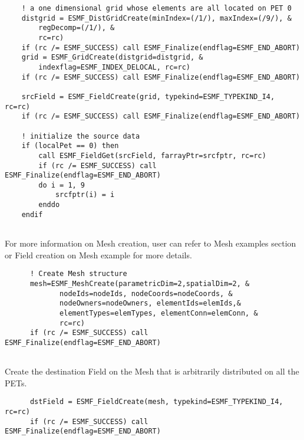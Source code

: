  \begin{verbatim}
    ! a one dimensional grid whose elements are all located on PET 0
    distgrid = ESMF_DistGridCreate(minIndex=(/1/), maxIndex=(/9/), &
        regDecomp=(/1/), &
        rc=rc)
    if (rc /= ESMF_SUCCESS) call ESMF_Finalize(endflag=ESMF_END_ABORT)
    grid = ESMF_GridCreate(distgrid=distgrid, &
        indexflag=ESMF_INDEX_DELOCAL, rc=rc)
    if (rc /= ESMF_SUCCESS) call ESMF_Finalize(endflag=ESMF_END_ABORT)

    srcField = ESMF_FieldCreate(grid, typekind=ESMF_TYPEKIND_I4, rc=rc)
    if (rc /= ESMF_SUCCESS) call ESMF_Finalize(endflag=ESMF_END_ABORT)

    ! initialize the source data
    if (localPet == 0) then
        call ESMF_FieldGet(srcField, farrayPtr=srcfptr, rc=rc)
        if (rc /= ESMF_SUCCESS) call ESMF_Finalize(endflag=ESMF_END_ABORT)
        do i = 1, 9
            srcfptr(i) = i
        enddo
    endif
 
\end{verbatim}
 

   For more information on Mesh creation, user can refer to Mesh examples section or Field creation
   on Mesh example for more details. 

 \begin{verbatim}
      ! Create Mesh structure
      mesh=ESMF_MeshCreate(parametricDim=2,spatialDim=2, &
             nodeIds=nodeIds, nodeCoords=nodeCoords, &
             nodeOwners=nodeOwners, elementIds=elemIds,&
             elementTypes=elemTypes, elementConn=elemConn, &
             rc=rc)
      if (rc /= ESMF_SUCCESS) call ESMF_Finalize(endflag=ESMF_END_ABORT)
 
\end{verbatim}
 

   Create the destination Field on the Mesh that is arbitrarily distributed on 
   all the PETs. 

 \begin{verbatim}
      dstField = ESMF_FieldCreate(mesh, typekind=ESMF_TYPEKIND_I4, rc=rc)
      if (rc /= ESMF_SUCCESS) call ESMF_Finalize(endflag=ESMF_END_ABORT)
 
\end{verbatim}
 
